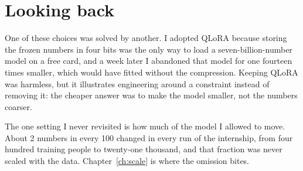 

\section{Looking back}
\label{sec:retro-tools}

One of these choices was solved by another. I adopted QLoRA because storing the
frozen numbers in four bits was the only way to load a seven-billion-number model
on a free card, and a week later I abandoned that model for one fourteen times
smaller, which would have fitted without the compression. Keeping QLoRA was
harmless, but it illustrates engineering around a constraint instead of removing
it: the cheaper answer was to make the model smaller, not the numbers coarser.

The one setting I never revisited is how much of the model I allowed to move.
About 2 numbers in every 100 changed in every run of the internship, from four
hundred training people to twenty-one thousand, and that fraction was never
scaled with the data. Chapter~\ref{ch:scale} is where the omission bites.
